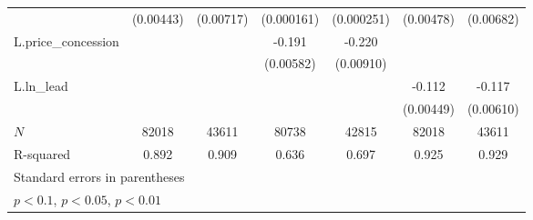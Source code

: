 {\begin{tabular}{l*{6}{c}}
            &   (0.00443)         &   (0.00717)         &  (0.000161)         &  (0.000251)         &   (0.00478)         &   (0.00682)         \\
\addlinespace
L.price\_concession&                     &                     &      -0.191\sym{***}&      -0.220\sym{***}&                     &                     \\
            &                     &                     &   (0.00582)         &   (0.00910)         &                     &                     \\
\addlinespace
L.ln\_lead   &                     &                     &                     &                     &      -0.112\sym{***}&      -0.117\sym{***}\\
            &                     &                     &                     &                     &   (0.00449)         &   (0.00610)         \\
\midrule
\(N\)       &       82018         &       43611         &       80738         &       42815         &       82018         &       43611         \\
R-squared   &       0.892         &       0.909         &       0.636         &       0.697         &       0.925         &       0.929         \\
\bottomrule
\multicolumn{7}{l}{\footnotesize Standard errors in parentheses}\\
\multicolumn{7}{l}{\footnotesize \sym{*} \(p<0.1\), \sym{**} \(p<0.05\), \sym{***} \(p<0.01\)}\\
\end{tabular}
}
